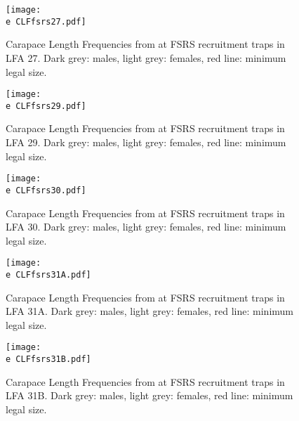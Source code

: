 \documentclass[11pt]{article}
\newcommand{\e}{\string~/bio.data/bio.lobster/figures/LFA2733Framework2018/} %
\begin{document}
    \begin{figure}
    \centering
        \texttt{[image: \\e CLFfsrs27.pdf]}
        \caption{Carapace Length Frequencies from at FSRS recruitment traps in LFA 27. Dark grey: males, light grey: females, red line: minimum legal size.}

    \end{figure}


    \begin{figure}
    \centering
        \texttt{[image: \\e CLFfsrs29.pdf]}
        \caption{Carapace Length Frequencies from at FSRS recruitment traps in LFA 29. Dark grey: males, light grey: females, red line: minimum legal size.}

    \end{figure}


    \begin{figure}
    \centering
        \texttt{[image: \\e CLFfsrs30.pdf]}
        \caption{Carapace Length Frequencies from at FSRS recruitment traps in LFA 30. Dark grey: males, light grey: females, red line: minimum legal size.}

    \end{figure}


    \begin{figure}
    \centering
        \texttt{[image: \\e CLFfsrs31A.pdf]}
        \caption{Carapace Length Frequencies from at FSRS recruitment traps in LFA 31A. Dark grey: males, light grey: females, red line: minimum legal size.}

    \end{figure}


    \begin{figure}
    \centering
        \texttt{[image: \\e CLFfsrs31B.pdf]}
        \caption{Carapace Length Frequencies from at FSRS recruitment traps in LFA 31B. Dark grey: males, light grey: females, red line: minimum legal size.}

    \end{figure}
\end{document}
